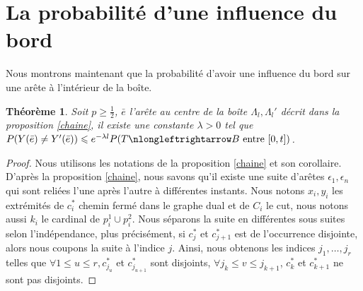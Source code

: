 \documentclass[titlepage,a4paper,12pt]{article}
\newcounter{thm}
\newcounter{prop}
\newcounter{cor}
\newtheorem{cvg}[thm]{Théorème}
\begin{document}
\section{La probabilité d'une influence du bord}

Nous montrons maintenant que la probabilité d'avoir une influence du bord sur une arête à l'intérieur de la boîte. 
\begin{cvg}
Soit $p\geqslant \frac{1}{2}$, $\bar{e}$ l'arête au centre de la boîte $\Lambda_l, \Lambda_l'$ décrit dans la proposition \ref{chaine}, il existe une constante $\lambda> 0$ tel que $P(Y(\bar{e})\neq Y'(\bar{e})) \leqslant e^{-\lambda l} P(T\nlongleftrightarrow B \text{ entre }[0,t])$.
\end{cvg}

\begin{proof}

Nous utilisons les notations de la proposition \ref{chaine} et son corollaire.
D'après la proposition \ref{chaine}, nous savons qu'il existe une suite d'arêtes $\epsilon_1,\epsilon_n$ qui sont reliées l'une après l'autre à différentes instants. Nous notons $x_i,y_i$ les extrémités de $c_i^*$ chemin fermé dans le graphe dual et de $C_i$ le cut, nous notons aussi $k_i$ le cardinal de $p_i^1\cup p_i^2$. Nous séparons la suite en différentes sous suites selon l'indépendance, plus précisément, si $c^*_j$ et $c^*_{j+1}$  est de l'occurrence disjointe, alors nous coupons la suite à l'indice $j$. Ainsi, nous obtenons les indices $j_1,\dots,j_r$ telles que $\forall 1\leqslant u\leqslant r, c^*_{j_u}$ et $c^*_{j_{u+1}}$ sont disjoints, $\forall j_k \leqslant v \leqslant j_{k+1}$, $c_k^*$ et $c_{k+1}^*$ ne sont pas disjoints.


\end{proof}
\end{document}
